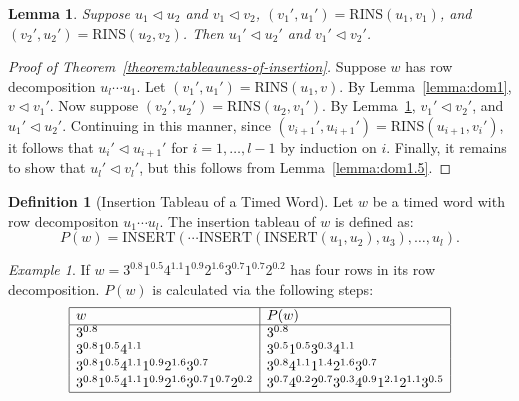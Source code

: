 \documentclass[10pt]{amsproc}
\newtheorem{lemma}[theorem]{Lemma}
\theoremstyle{definition}
\newtheorem{definition}[theorem]{Definition}
\theoremstyle{remark}
\newtheorem{example}[theorem]{Example}
\newcommand{\rowins}{\mathrm{RINS}}
\newcommand{\ins}{\mathrm{INSERT}}
\begin{document}
\begin{lemma}
  \label{lemma:dom2}
  Suppose $u_1\lhd u_2$ and $v_1\lhd v_2$, $(v_1',u_1')=\rowins(u_1,v_1)$, and $(v_2',u_2')=\rowins(u_2,v_2)$.
  Then $u_1'\lhd u_2'$ and $v_1'\lhd v_2'$.
\end{lemma}
\begin{proof}[Proof of Theorem~\ref{theorem:tableauness-of-insertion}]
  Suppose $w$ has row decomposition $u_l\dotsb u_1$.
  Let $(v_1',u_1')=\rowins(u_1,v)$.
  By Lemma~\ref{lemma:dom1}, $v\lhd v_1'$.
  Now suppose $(v_2',u_2')=\rowins(u_2,v_1')$.
  By Lemma~\ref{lemma:dom2}, $v_1'\lhd v_2'$, and $u_1'\lhd u_2'$.
  Continuing in this manner, since $(v_{i+1}',u_{i+1}')=\rowins(u_{i+1},v_i')$, it follows that $u_i'\lhd u_{i+1}'$ for $i=1,\dotsc,l-1$ by induction on $i$.
  Finally, it remains to show that $u_l'\lhd v_l'$, but this follows from Lemma~\ref{lemma:dom1.5}.
\end{proof}
\begin{definition}
  [Insertion Tableau of a Timed Word]
  Let $w$ be a timed word with row decompositon $u_1\dotsb u_l$.
  The insertion tableau of $w$ is defined as:
  \begin{displaymath}
    P(w) = \ins(\dotsb\ins(\ins(u_1, u_2),u_3),\dotsc,u_l).
  \end{displaymath}
\end{definition}
\begin{example}
  If $w=3^{0.8}1^{0.5}4^{1.1}1^{0.9}2^{1.6}3^{0.7}1^{0.7}2^{0.2}$ has four rows in its row decomposition.
  $P(w)$ is calculated via the following steps:
  \begin{displaymath}
    \begin{array}{|l|l|}
      \hline
      w & P(w)\\
      \hline
      3^{0.8} & 3^{0.8}\\
      3^{0.8}1^{0.5}4^{1.1} & 3^{0.5}1^{0.5}3^{0.3}4^{1.1}\\
      3^{0.8}1^{0.5}4^{1.1}1^{0.9}2^{1.6}3^{0.7} & 3^{0.8}4^{1.1}1^{1.4}2^{1.6}3^{0.7}\\
      3^{0.8}1^{0.5}4^{1.1}1^{0.9}2^{1.6}3^{0.7}1^{0.7}2^{0.2} & 3^{0.7}4^{0.2}2^{0.7}3^{0.3}4^{0.9}1^{2.1}2^{1.1}3^{0.5}\\
      \hline
    \end{array}
  \end{displaymath}
\end{example}
\end{document}
